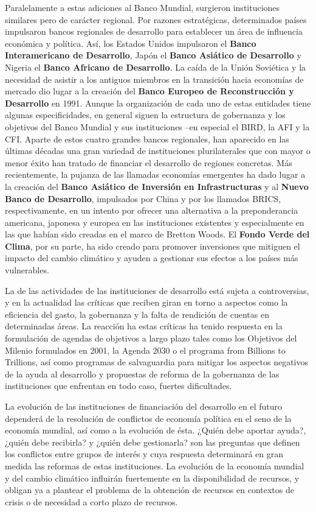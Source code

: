 \documentclass{nuevotema}
\begin{document}
Paralelamente a estas adiciones al Banco Mundial, surgieron instituciones similares pero de carácter regional. Por razones estratégicas, determinados países impulsaron bancos regionales de desarrollo para establecer un área de influencia económica y política. Así, los Estados Unidos impulsaron el \textbf{Banco Interamericano de Desarrollo}, Japón el \textbf{Banco Asiático de Desarrollo} y Nigeria el \textbf{Banco Africano de Desarrollo}. La caída de la Unión Soviética y la necesidad de asistir a los antiguos miembros en la transición hacia economías de mercado dio lugar a la creación del \textbf{Banco Europeo de Reconstrucción y Desarrollo} en 1991. Aunque la organización de cada uno de estas entidades tiene algunas especificidades, en general siguen la estructura de gobernanza y los objetivos del Banco Mundial y sus instituciones --en especial el BIRD, la AFI y la CFI. Aparte de estos cuatro grandes bancos regionales, han aparecido en las últimas décadas una gran variedad de instituciones plurilaterales que con mayor o menor éxito han tratado de financiar el desarrollo de regiones concretas. Más recientemente, la pujanza de las llamadas economías emergentes ha dado lugar a la creación del \textbf{Banco Asiático de Inversión en Infrastructuras} y al \textbf{Nuevo Banco de Desarrollo}, impulsados por China y por los llamados BRICS, respectivamente, en un intento por ofrecer una alternativa a la preponderancia americana, japonesa y europea en las instituciones existentes y especialmente en las que habían sido creadas en el marco de Bretton Woods. El \textbf{Fondo Verde del Clima}, por su parte, ha sido creado para promover inversiones que mitiguen el impacto del cambio climático y ayuden a gestionar sus efectos a los países más vulnerables.

La  de las actividades de las instituciones de desarrollo está sujeta a controversias, y en la actualidad las críticas que reciben giran en torno a aspectos como la eficiencia del gasto, la gobernanza y la falta de rendición de cuentas en determinadas áreas. La reacción ha estas críticas ha tenido respuesta en la formulación de agendas de objetivos a largo plazo tales como los Objetivos del Milenio formulados en 2001, la Agenda 2030 o el programa from Billions to Trillions, así como programas de salvaguardia para mitigar los aspectos negativos de la ayuda al desarrollo y propuestas de reforma de la gobernanza de las instituciones que enfrentan en todo caso, fuertes dificultades.

La evolución de las instituciones de financiación del desarrollo en el futuro dependerá de la resolución de conflictos de economía política en el seno de la economía mundial, así como a la evolución de ésta. ¿Quién debe aportar ayuda?, ¿quién debe recibirla? y ¿quién debe gestionarla? son las preguntas que definen los conflictos entre grupos de interés y cuya respuesta determinará en gran medida las reformas de estas instituciones. La evolución de la economía mundial y del cambio climático influirán fuertemente en la disponibilidad de recursos, y obligan ya a plantear el problema de la obtención de recursos en contextos de crisis o de necesidad a corto plazo de recursos.
\end{document}
